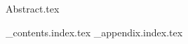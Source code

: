 \documentclass[openright, twoside]{report}
\begin{document}
  \begin{titlepage}
    \centering
    \vspace*{2cm}
    \titleblock [1cm]
    \vspace{1cm}  %
    \authorblock
    \vfill  %
    \location \\
    \dateblock \\
    \footnotesize { \texttt{\fullversion} }
  \end{titlepage}

  \attributionpage

  {Abstract.tex}

  \newpage
  \tableofcontents
  \newpage

  {_contents.index.tex}
  {_appendix.index.tex}

  \nocite{*}  
  \printbibliography
\end{document}
